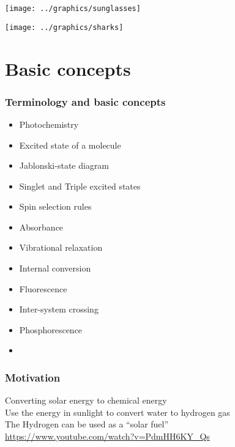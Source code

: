 \documentclass[ignorenonframetext]{beamer}
\begin{document}
\begin{frame}
  \begin{center}
     \texttt{[image: ../graphics/sunglasses]}
  \end{center}
\end{frame}

\begin{frame}
  \begin{center}
     \texttt{[image: ../graphics/sharks]}
  \end{center}
\end{frame}
	
\section{Basic concepts}

\begin{frame}[<+->]
\frametitle{Terminology and basic concepts}
  \begin{itemize}
  \item Photochemistry
  \item Excited state of a molecule
  \item Jablonski-state diagram
  \item Singlet and Triple excited states
  \item Spin selection rules
  \item Absorbance
  \item Vibrational relaxation
  \item Internal conversion
  \item Fluorescence
  \item Inter-system crossing
  \item Phosphorescence
  \item[] 
  \end{itemize}
\end{frame}

\begin{frame}
\frametitle{Motivation}
\textbullet Converting solar energy to chemical energy\medskip\\
\textbullet Use the energy in sunlight to convert water to hydrogen gas\medskip\\
\textbullet The Hydrogen can be used as a ``solar fuel''\medskip\\

\url{https://www.youtube.com/watch?v=PdmHH6KY_Qs}
\end{frame}
\end{document}
